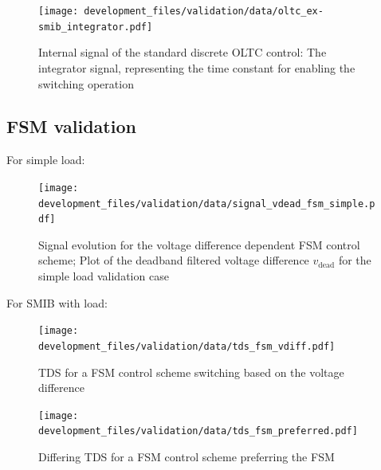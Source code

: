\begin{figure}[H]
    \centering
    \texttt{[image: development\_files/validation/data/oltc\_ex-smib\_integrator.pdf]}
    \caption{Internal signal of the standard discrete \acs{OLTC} control: The integrator signal, representing the time constant for enabling the switching operation}
    \label{fig:int-signal-oltc-ext-smib-integrator}
\end{figure}

\subsection{FSM validation}

For simple load:
\begin{figure}[H]
    \centering
    \texttt{[image: development\_files/validation/data/signal\_vdead\_fsm\_simple.pdf]}
    \caption{Signal evolution for the voltage difference dependent \acs{FSM} control scheme; Plot of the deadband filtered voltage difference $v_\mathrm{dead}$ for the simple load validation case}
    \label{fig:signal-vdead-fsm-simple}
\end{figure}

For SMIB with load:

\begin{figure}[H]
    \centering
    \texttt{[image: development\_files/validation/data/tds\_fsm\_vdiff.pdf]}
    \caption[\acs{TDS} for a \acs{FSM} control scheme switching based on the voltage difference]{\acs{TDS} for a \acs{FSM} control scheme switching based on the voltage difference}
    \label{fig:tds-fsm-vdiff-ext-smib}
\end{figure}


\begin{figure}[H]
    \centering
    \texttt{[image: development\_files/validation/data/tds\_fsm\_preferred.pdf]}
    \caption[Differing \acs{TDS} for a \acs{FSM} control scheme preferring the \acs{FSM}]{Differing \acs{TDS} for a \acs{FSM} control scheme preferring the \acs{FSM}}
    \label{fig:tds-fsm-preferred}
\end{figure}

